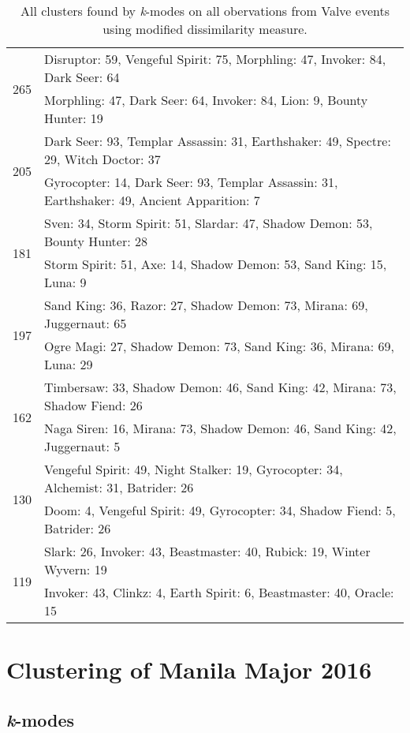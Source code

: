 \documentclass[result.tex]{subfiles}
\begin{document}
\begin{table}[H]
\begin{tabular}{ | c | p{12.5cm} | }
    \hline
    \multirow{2}{*}{265}
    & Disruptor: 59, Vengeful Spirit: 75, Morphling: 47, Invoker: 84, Dark Seer: 64 \\
    & Morphling: 47, Dark Seer: 64, Invoker: 84, Lion: 9, Bounty Hunter: 19 \\
    \hline
    \multirow{2}{*}{205}
    & Dark Seer: 93, Templar Assassin: 31, Earthshaker: 49, Spectre: 29, Witch Doctor: 37 \\
    & Gyrocopter: 14, Dark Seer: 93, Templar Assassin: 31, Earthshaker: 49, Ancient Apparition: 7 \\
    \hline
    \multirow{2}{*}{181}
    & Sven: 34, Storm Spirit: 51, Slardar: 47, Shadow Demon: 53, Bounty Hunter: 28 \\
    & Storm Spirit: 51, Axe: 14, Shadow Demon: 53, Sand King: 15, Luna: 9 \\
    \hline
    \multirow{2}{*}{197}
    & Sand King: 36, Razor: 27, Shadow Demon: 73, Mirana: 69, Juggernaut: 65 \\
    & Ogre Magi: 27, Shadow Demon: 73, Sand King: 36, Mirana: 69, Luna: 29 \\
    \hline
    \multirow{2}{*}{162}
    & Timbersaw: 33, Shadow Demon: 46, Sand King: 42, Mirana: 73, Shadow Fiend: 26 \\
    & Naga Siren: 16, Mirana: 73, Shadow Demon: 46, Sand King: 42, Juggernaut: 5 \\
    \hline
    \multirow{2}{*}{130}
    & Vengeful Spirit: 49, Night Stalker: 19, Gyrocopter: 34, Alchemist: 31, Batrider: 26 \\
    & Doom: 4, Vengeful Spirit: 49, Gyrocopter: 34, Shadow Fiend: 5, Batrider: 26 \\
    \hline
    \multirow{2}{*}{119}
    & Slark: 26, Invoker: 43, Beastmaster: 40, Rubick: 19, Winter Wyvern: 19 \\
    & Invoker: 43, Clinkz: 4, Earth Spirit: 6, Beastmaster: 40, Oracle: 15 \\
    \hline
  \end{tabular}
  \caption{All clusters found by \textit{k}-modes on all obervations from Valve events using modified dissimilarity measure.}
  \label{tab:cl_app_all_kmodes_mod}
\end{table}

\clearpage
\section*{Clustering of Manila Major 2016}

\subsection*{\textit{k}-modes}
\end{document}
